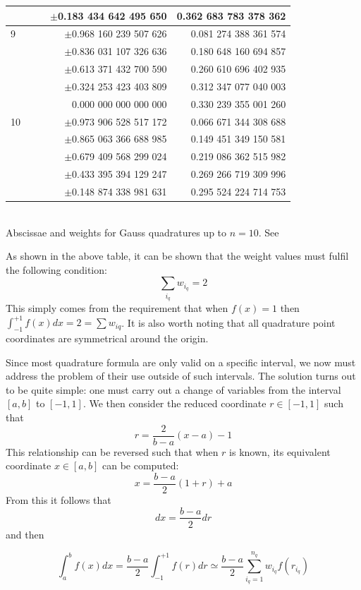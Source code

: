 \begin{center}
\begin{tabular}{lllrr}
  & & & $\pm$0.183 434 642 495 650 & 0.362 683 783 378 362\\
\hline
9 & & & $\pm$0.968 160 239 507 626 & 0.081 274 388 361 574\\
  & & & $\pm$0.836 031 107 326 636 & 0.180 648 160 694 857\\
  & & & $\pm$0.613 371 432 700 590 & 0.260 610 696 402 935\\
  & & & $\pm$0.324 253 423 403 809 & 0.312 347 077 040 003\\
  & & & 0.000 000 000 000 000 & 0.330 239 355 001 260\\
\hline
10 &&& $\pm$0.973 906 528 517 172 & 0.066 671 344 308 688\\
   &&& $\pm$0.865 063 366 688 985 & 0.149 451 349 150 581\\
   &&& $\pm$0.679 409 568 299 024 & 0.219 086 362 515 982\\
   &&& $\pm$0.433 395 394 129 247 & 0.269 266 719 309 996\\
   &&& $\pm$0.148 874 338 981 631 & 0.295 524 224 714 753\\
\hline
\end{tabular}\\
{\captionfont Abscissae and weights for Gauss quadratures up to $n=10$. See \cite[p89]{li06}}
\end{center}

As shown in the above table, it can be shown that the weight values must fulfil the following condition:
\begin{equation}
\sum_{i_q} w_{i_q}=2 \label{gq23}
\end{equation}
This simply comes from the requirement that when $f(x)=1$ then $\int_{-1}^{+1}f(x)dx=2=\sum w_{iq}$.
It is also worth noting that all quadrature point coordinates are symmetrical around the origin.

Since most quadrature formula are only valid on a specific interval, we now must address the problem 
of their use outside of such intervals. The solution turns out to be quite simple: one 
must carry out a change of variables from the interval $[a,b]$ to $[-1,1]$.
We then consider the reduced coordinate $r\in[-1,1]$ such that 
\begin{equation}
r=\frac{2}{b-a}(x-a)-1 
\end{equation}
This relationship can be reversed such that when $r$ is known, its equivalent coordinate 
$x\in[a,b]$ can be computed:
\begin{equation}
x=\frac{b-a}{2}(1+r)+a
\end{equation}
From this it follows that
\begin{equation}
dx=\frac{b-a}{2}dr
\end{equation}
and then 
\begin{mdframed}[backgroundcolor=blue!5]
\begin{equation}
\int_a^b f(x) dx  = \frac{b-a}{2} \int_{-1}^{+1} f(r) dr \simeq 
\frac{b-a}{2} \sum_{i_q=1}^{n_q} w_{i_q} f(r_{i_q})
\end{equation}
\end{mdframed}

